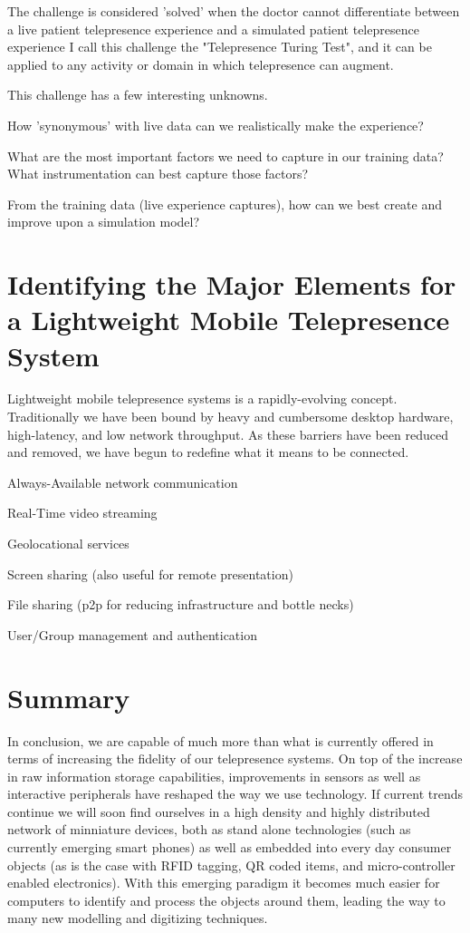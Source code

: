 \documentclass[a4paper,12pt]{report}
\begin{document}
The challenge is considered 'solved' when the doctor cannot differentiate between a live patient telepresence experience and a simulated patient telepresence experience
I call this challenge the "Telepresence Turing Test", and it can be applied to any activity or domain in which telepresence can augment.

This challenge has a few interesting unknowns.

How 'synonymous' with live data can we realistically make the experience?

What are the most important factors we need to capture in our training data? What instrumentation can best capture those factors?

From the training data (live experience captures), how can we best create and improve upon a simulation model?\cite{391769} 

\section{Identifying the Major Elements for a Lightweight Mobile Telepresence System}

Lightweight mobile telepresence systems is a rapidly-evolving concept. Traditionally we have been bound by heavy and cumbersome desktop hardware, high-latency, and low network throughput. As these barriers have been reduced and removed, we have begun to redefine what it means to be connected.

Always-Available network communication

Real-Time video streaming

Geolocational services

Screen sharing (also useful for remote presentation)

File sharing (p2p for reducing infrastructure and bottle necks)

User/Group management and authentication

\section{Summary}

In conclusion, we are capable of much more than what is currently offered in terms of increasing the fidelity of our telepresence systems. On top of the increase in raw information storage capabilities, improvements in sensors as well as interactive peripherals have reshaped the way we use technology. If current trends continue we will soon find ourselves in a high density and highly distributed network of minniature devices, both as stand alone technologies (such as currently emerging smart phones) as well as embedded into every day consumer objects (as is the case with RFID tagging, QR coded items, and micro-controller enabled electronics). With this emerging paradigm it becomes much easier for computers to identify and process the objects around them, leading the way to many new modelling and digitizing techniques.
\end{document}
